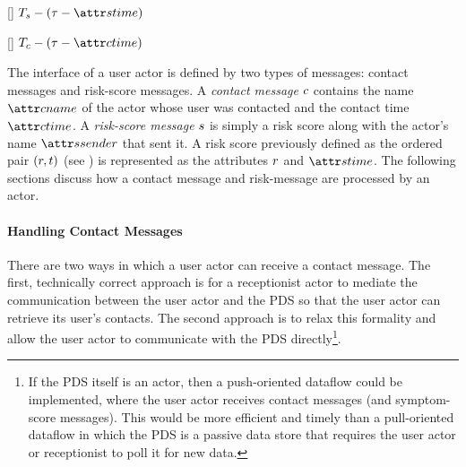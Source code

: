 %
\begin{function}{\nScoreTtl}[\vScore]
    \State \Return $\pScoreTtl - (\vRefTime - \aScoreTime)$
\end{function}
\begin{function}{\nContactTtl}[\vContact]
    \State \Return $\pContactTtl - (\vRefTime - \aContactTime)$
\end{function}
%
The interface of a user actor is defined by two types of messages: contact messages and risk-score messages. A \emph{contact message} $c$ contains the name $\aContactName$ of the actor whose user was contacted and the contact time $\aContactTime$. A \emph{risk-score message} $s$ is simply a risk score along with the actor's name $\aScoreSender$ that sent it. A risk score previously defined as the ordered pair $(r, t)$ (see ) is represented as the attributes $r$ and $\aScoreTime$. The following sections discuss how a contact message and risk-message are processed by an actor.

\paragraph{Handling Contact Messages}\label{sec:contact-message-handling}

There are two ways in which a user actor can receive a contact message. The first, technically correct approach is for a receptionist actor to mediate the communication between the user actor and the PDS so that the user actor can retrieve its user's contacts. The second approach is to relax this formality and allow the user actor to communicate with the PDS directly\footnote{If the PDS itself is an actor, then a push-oriented dataflow could be implemented, where the user actor receives contact messages (and symptom-score messages). This would be more efficient and timely than a pull-oriented dataflow in which the PDS is a passive data store that requires the user actor or receptionist to poll it for new data.}.

